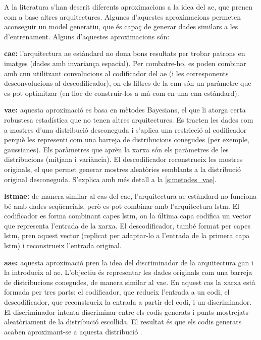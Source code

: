 \documentclass[CAT,BIB]{TFUOC}%
\begin{document}
        A la literatura s'han descrit diferents aproximacions a la idea del \gls{ae}, que prenen com a base altres arquitectures. Algunes d'aquestes aproximacions permeten aconseguir un model generatiu, que és capaç de generar dades similars a les d'entrenament. Alguns d'aquestes aproximacions són:

        \textbf{\Gls{cae}:} l'arquitectura \gls{ae} estàndard no dona bons resultats per trobar patrons en imatges (dades amb invariança espacial). Per combatre-ho, es poden combinar amb \gls{cnn} utilitzant convolucions al codificador del \gls{ae} (i les corresponents desconvolucions al descodificador), on els filtres de la \gls{cnn} són un paràmetre que es pot optimitzar (en lloc de construir-los a mà com en una \gls{cnn} estàndard).

        \textbf{\Gls{vae}:} aquesta aproximació es basa en mètodes Bayesians, el que li atorga certa robustesa estadística que no tenen altres arquitectures. Es tracten les dades com a mostres d'una distribució desconeguda i s'aplica una restricció al codificador perquè les representi com una barreja de distribucions conegudes (per exemple, gaussianes). Els paràmetres que aprèn la xarxa són els paràmetres de les distribucions (mitjana i variància). El descodificador reconstrueix les mostres originals, el que permet generar mostres aleatòries semblants a la distribució original desconeguda. S'explica amb més detall a la \cref{s:metodes_vae}.

        \textbf{\Gls{lstmae}:} de manera similar al cas del \gls{cae}, l'arquitectura \gls{ae} estàndard no funciona bé amb dades seqüencials, però es pot combinar amb l'arquitectura \gls{lstm}. El codificador es forma combinant capes \gls{lstm}, on la última capa codifica un vector que representa l'entrada de la xarxa. El descodificador, també format per capes \gls{lstm}, pren aquest vector (replicat per adaptar-lo a l'entrada de la primera capa \gls{lstm}) i reconstrueix l'entrada original.

        \textbf{\Gls{aae}:} aquesta aproximació pren la idea del discriminador de la arquitectura \gls{gan} i la introdueix al \gls{ae}. L'objectiu és representar les dades originals com una barreja de distribucions conegudes, de manera similar al \gls{vae}. En aquest cas la xarxa està formada per tres parts: el codificador, que redueix l'entrada a un codi, el descodificador, que reconstrueix la entrada a partir del codi, i un discriminador. El discriminador intenta discriminar entre els codis generats i punts mostrejats aleatòriament de la distribució escollida. El resultat és que els codis generats acaben aproximant-se a aquesta distribució \citep{Makhzani2015}.
\end{document}
